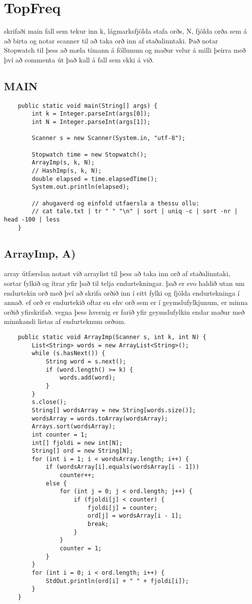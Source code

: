 \documentclass{article}
\begin{document}
\newpage
\section*{TopFreq}
skrifaði main fall sem tekur inn k, lágmarksfjölda stafa orðs, 
N, fjölda orða sem á að birta
og notar scanner til að taka orð inn af staðalinntaki.
Það notar Stopwatch til þess að mæla tímann á föllunum og maður velur á milli þeirra með því að commenta út það kall á fall sem ekki á við.

\subsection*{MAIN}
\begin{lstlisting}
    public static void main(String[] args) {
        int k = Integer.parseInt(args[0]);
        int N = Integer.parseInt(args[1]);

        Scanner s = new Scanner(System.in, "utf-8");

        Stopwatch time = new Stopwatch();
        ArrayImp(s, k, N);
        // HashImp(s, k, N);
        double elapsed = time.elapsedTime();
        System.out.println(elapsed);

        // ahugaverd og einfold utfaersla a thessu ollu:
        // cat tale.txt | tr " " "\n" | sort | uniq -c | sort -nr | head -100 | less
    }
\end{lstlisting}
\newpage
\subsection*{ArrayImp, A)}
array útfærslan notast við arraylist til þess að taka inn orð af staðalinntaki,
sortar fylkið og ítrar yfir það til telja endurtekningar. 
það er svo haldið utan um endurtekin orð með því að skrifa orðið inn í eitt fylki
og fjölda endurtekninga í annað. 
ef orð er endurtekið oftar en ehv orð sem er í geymslufylkjunum, er minna orðið yfirskrifað.
vegna þess hvernig er farið yfir geymslufylkin endar maður með minnkandi listas af
endurteknum orðum.
\begin{lstlisting}
    public static void ArrayImp(Scanner s, int k, int N) {
        List<String> words = new ArrayList<String>(); 
        while (s.hasNext()) {
            String word = s.next();
            if (word.length() >= k) { 
                words.add(word);
            }
        }
        s.close();
        String[] wordsArray = new String[words.size()];
        wordsArray = words.toArray(wordsArray);
        Arrays.sort(wordsArray);
        int counter = 1;
        int[] fjoldi = new int[N];
        String[] ord = new String[N];
        for (int i = 1; i < wordsArray.length; i++) { 
            if (wordsArray[i].equals(wordsArray[i - 1]))
                counter++; 
            else {
                for (int j = 0; j < ord.length; j++) {
                    if (fjoldi[j] < counter) { 
                        fjoldi[j] = counter; 
                        ord[j] = wordsArray[i - 1]; 
                        break;
                    }
                }
                counter = 1;
            }
        }
        for (int i = 0; i < ord.length; i++) {
            StdOut.println(ord[i] + " " + fjoldi[i]);
        }
    }
\end{lstlisting}
\end{document}
